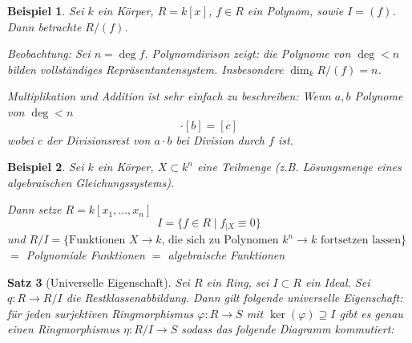 \documentclass[a4paper,12pt,numbers=noenddot,parskip=full]{scrartcl}
\theoremstyle{dotless}
\newtheorem{theorem}{Satz}[section]
\newtheorem{example}[theorem]{Beispiel}
\theoremstyle{remark}
\begin{document}
	\begin{example}
		Sei $k$ ein Körper, $R = k[x]$, $f \in R$ ein Polynom, sowie $I = (f)$. Dann betrachte $R/(f)$.
		
		Beobachtung: Sei $n = \deg f$. Polynomdivison zeigt: die Polynome von $\deg < n$ bilden vollständiges Repräsentantensystem. Insbesondere $\dim_k R/(f) = n$.
		
		Multiplikation und Addition ist sehr einfach zu beschreiben: Wenn $a,b$ Polynome von $\deg < n$
		\begin{equation*}
			[a] \cdot [b] = [c]
		\end{equation*}
		wobei $c$ der Divisionsrest von $a \cdot b$ bei Division durch $f$ ist.
	\end{example}

	\begin{example}
		Sei $k$ ein Körper, $X \subset k^n$ eine Teilmenge (z.B. Lösungsmenge eines algebraischen Gleichungssystems).
		
		Dann setze $R = k[x_1, \dots, x_n]$
		\begin{equation*}
			I = \{ f \in R \mid f_{\mid X} \equiv 0 \}
		\end{equation*}
		und $R/I = \{ \text{Funktionen $X \to k$, die sich zu Polynomen $k^n \to k$ fortsetzen lassen} \}$ $=$ Polynomiale Funktionen $=$ algebraische Funktionen
	\end{example}

	\begin{theorem}[Universelle Eigenschaft]
		Sei $R$ ein Ring, sei $I \subset R$ ein Ideal. Sei $q: R \to R/I$ die Restklassenabbildung. Dann gilt folgende universelle Eigenschaft: für jeden surjektiven Ringmorphismus $\varphi: R \to S$ mit $\ker(\varphi) \supseteq I$ gibt es genau einen Ringmorphismus $\eta: R/I \to S$ sodass das folgende Diagramm kommutiert:
		
		\begin{center}
		\end{center}
	\end{theorem}
\end{document}
